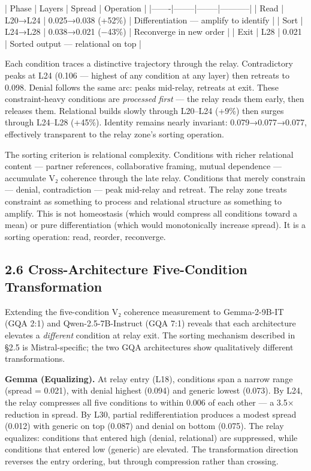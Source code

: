 \documentclass[12pt]{article}
\begin{document}
| Phase | Layers | Spread | Operation |
|-------|--------|--------|-----------|
| Read | L20→L24 | 0.025→0.038 (+52\%) | Differentiation — amplify to identify |
| Sort | L24→L28 | 0.038→0.021 (−43\%) | Reconverge in new order |
| Exit | L28 | 0.021 | Sorted output — relational on top |

Each condition traces a distinctive trajectory through the relay. Contradictory peaks at L24 (0.106 — highest of any condition at any layer) then retreats to 0.098. Denial follows the same arc: peaks mid-relay, retreats at exit. These constraint-heavy conditions are \textit{processed first} — the relay reads them early, then releases them. Relational builds slowly through L20–L24 (+9\%) then surges through L24–L28 (+45\%). Identity remains nearly invariant: 0.079→0.077→0.077, effectively transparent to the relay zone's sorting operation.

The sorting criterion is relational complexity. Conditions with richer relational content — partner references, collaborative framing, mutual dependence — accumulate V₂ coherence through the late relay. Conditions that merely constrain — denial, contradiction — peak mid-relay and retreat. The relay zone treats constraint as something to process and relational structure as something to amplify. This is not homeostasis (which would compress all conditions toward a mean) or pure differentiation (which would monotonically increase spread). It is a sorting operation: read, reorder, reconverge.

\subsection*{2.6 Cross-Architecture Five-Condition Transformation}

Extending the five-condition V₂ coherence measurement to Gemma-2-9B-IT (GQA 2:1) and Qwen-2.5-7B-Instruct (GQA 7:1) reveals that each architecture elevates a \textit{different} condition at relay exit. The sorting mechanism described in §2.5 is Mistral-specific; the two GQA architectures show qualitatively different transformations.

\textbf{Gemma (Equalizing).} At relay entry (L18), conditions span a narrow range (spread = 0.021), with denial highest (0.094) and generic lowest (0.073). By L24, the relay compresses all five conditions to within 0.006 of each other — a 3.5× reduction in spread. By L30, partial redifferentiation produces a modest spread (0.012) with generic on top (0.087) and denial on bottom (0.075). The relay equalizes: conditions that entered high (denial, relational) are suppressed, while conditions that entered low (generic) are elevated. The transformation direction reverses the entry ordering, but through compression rather than crossing.
\end{document}
